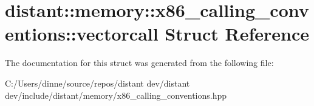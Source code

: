 \hypertarget{structdistant_1_1memory_1_1x86__calling__conventions_1_1vectorcall}{}\section{distant\+:\+:memory\+:\+:x86\+\_\+calling\+\_\+conventions\+:\+:vectorcall Struct Reference}
\label{structdistant_1_1memory_1_1x86__calling__conventions_1_1vectorcall}


The documentation for this struct was generated from the following file\+:\begin{DoxyCompactItemize}
\item 
C\+:/\+Users/dinne/source/repos/distant dev/distant dev/include/distant/memory/x86\+\_\+calling\+\_\+conventions.\+hpp\end{DoxyCompactItemize}
